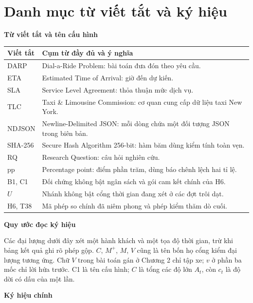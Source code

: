 ﻿\chapter*{Danh mục từ viết tắt và ký hiệu}

\noindent\textbf{Từ viết tắt và tên cấu hình}

\begin{longtable}{@{}p{2.4cm}p{12.4cm}@{}}
\toprule
\textbf{Viết tắt} & \textbf{Cụm từ đầy đủ và ý nghĩa}\\
\midrule
\endhead
DARP & Dial-a-Ride Problem: bài toán đưa đón theo yêu cầu.\\
ETA & Estimated Time of Arrival: giờ đến dự kiến.\\
SLA & Service Level Agreement: thỏa thuận mức dịch vụ.\\
TLC & Taxi \& Limousine Commission: cơ quan cung cấp dữ liệu taxi New York.\\
NDJSON & Newline-Delimited JSON: mỗi dòng chứa một đối tượng JSON trong biên bản.\\
SHA-256 & Secure Hash Algorithm 256-bit: hàm băm dùng kiểm tính toàn vẹn.\\
RQ & Research Question: câu hỏi nghiên cứu.\\
pp & Percentage point: điểm phần trăm, dùng báo chênh lệch hai tỉ lệ.\\
B1, C1 & Đối chứng không bật ngân sách và gói cam kết chính của H6.\\
$U$ & Nhánh không bật cổng thời gian đang xét ở các đợt trôi dạt.\\
H6, T38 & Mã phép so chính đã niêm phong và phép kiểm thăm dò cuối.\\
\bottomrule
\end{longtable}

\noindent\textbf{Quy ước đọc ký hiệu}

Các đại lượng dưới đây xét một hành khách và một tọa độ thời gian, trừ khi bảng kết quả
ghi rõ phép gộp. $C$, $M^{+}$, $M$, $V$ cũng là tên bốn họ cổng kiểm đại lượng tương ứng.
Chữ $V$ trong bài toán gán ở Chương 2 chỉ tập xe; $v$ ở phần ba mốc chỉ lời hứa trước.
C1 là tên cấu hình; $C$ là tổng các độ lớn $A_t$, còn $c_t$ là độ dời có dấu của một lần.

\noindent\textbf{Ký hiệu chính}

